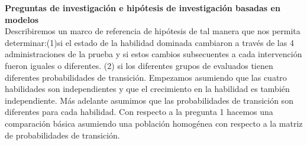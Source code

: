 \begin{table}[H]
	\centering
	\caption{Matriz Q para el test de FOC}
	\vspace{3mm}
	
\end{table}

\noindent
\textbf{Preguntas de investigaci\'{o}n e hip\'{o}tesis de investigaci\'{o}n basadas en modelos}\\
Describiremos un marco de referencia de hip\'{o}tesis de tal manera que nos permita determinar:(1)si el estado de la habilidad dominada cambiaron a trav\'{e}s de las 4 administraciones de la prueba y si estos cambios subsecuentes a cada intervenci\'{o}n fueron iguales o diferentes. (2) si los diferentes grupos de evaluados tienen diferentes probabilidades de transici\'{o}n. Empezamos asumiendo que las cuatro habilidades son independientes y que el crecimiento en la habilidad es tambi\'{e}n independiente. M\'{a}s adelante asumimos que las probabilidades de transici\'{o}n son diferentes para cada habilidad.
Con respecto a la pregunta 1 hacemos una comparaci\'{o}n b\'{a}sica asumiendo una poblaci\'{o}n homog\'{e}nea con respecto a la matriz de probabilidades de transici\'{o}n.



